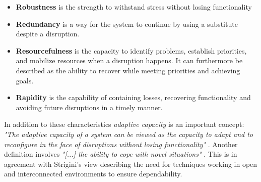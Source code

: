 \vspace{-4mm}
\begin{itemize}
    \setlength\itemsep{0.05em}
    \item \textbf{Robustness} is the strength to withstand stress without losing functionality 
    \item \textbf{Redundancy} is a way for the system to continue by using a substitute despite a disruption.
    \item \textbf{Resourcefulness} is the capacity to identify problems, establish priorities, and mobilize resources when a disruption happens. It can furthermore be described as the ability to recover while meeting priorities and achieving goals.
    \item \textbf{Rapidity} is the capability of containing losses, recovering functionality and avoiding future disruptions in a timely manner.
\end{itemize}

\noindent In addition to these characteristics \textit{adaptive capacity} is an important concept: \textit{"The adaptive capacity of a system can be viewed as the capacity to adapt and to reconfigure in the face of disruptions without losing functionality"} \cite[p. 25]{omer2013resilience}. Another definition involves \textit{"[...] the ability to cope with novel situations"} \cite[p. 25]{omer2013resilience}. This is in agreement with Strigini's view describing the need for techniques working in open and interconnected environments to ensure dependability.



